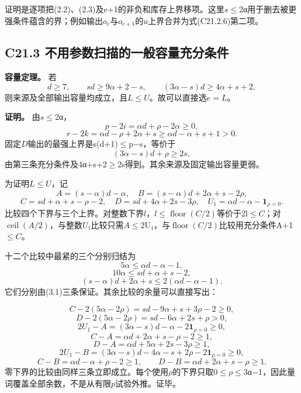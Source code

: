 {证明是逐项把(2.2)、(2.3)及e+1的非负和库存上界移项。这里\ensuremath{s}\ensuremath{\le}2α用于删去被更强条件蕴含的界；例如输出\ensuremath{o_{e}}与\ensuremath{o_{e+1}}的\ensuremath{u}上界合并为式(C21.2.6)第二项。}

\subsection*{\texorpdfstring{{C21.3} {不用参数扫描的一般容量充分条件}}{C21.3 不用参数扫描的一般容量充分条件}}\label{C21-h142}

\textbf{{容量定理。}} {若} \[
\boxed{
d\ge7,\qquad sd\ge9\alpha+2-s,\qquad
(3\alpha-s)d\ge4\alpha+s+2,
}
\tag{C21.3.1}
\] {则来源及全部输出容量均成立，且\ensuremath{L}\ensuremath{\le}\ensuremath{U}。故可以直接选\ensuremath{e=L}。}

\textbf{{证明。}} {由\ensuremath{s}\ensuremath{\le}2α，} \[
p-2i=\alpha d+\rho-2\alpha\ge0,
\] \[
r-2k=\alpha d-\rho+2\alpha+s
\ge\alpha d-\alpha+s+1>0.
\] {固定\ensuremath{D}输出的最强上界是s(d+1)\ensuremath{\le}p−s，等价于} \[
(3\alpha-s)d+\rho\ge2s,
\] {由第三条充分条件及4α+s+2\ensuremath{\ge}2s得到。其余来源及固定输出容量更弱。}

{为证明\ensuremath{L}\ensuremath{\le}\ensuremath{U}，记} \[
A=(s-\alpha)d-\alpha,\quad
B=(s-\alpha)d+2\alpha+s-2\rho,
\] \[
C=sd+\alpha+s-\rho-2,\quad
D=sd+4\alpha+2s-3\rho,\quad
U_1=\alpha d-\alpha-\mathbf1_{\rho=0}.
\] {比较四个下界与三个上界。对整数下界\ensuremath{l}，\ensuremath{l}\ensuremath{\le}\ensuremath{\operatorname{floor}(C/2)}等价于2l\ensuremath{\le}\ensuremath{C}；对\ensuremath{\operatorname{ceil}(A/2)}，与整数\ensuremath{U}₁比较只需\ensuremath{A}\ensuremath{\le}2U₁，与\ensuremath{\operatorname{floor}(C/2)}比较用充分条件A+1\ensuremath{\le}\ensuremath{C}。}

{十二个比较中最紧的三个分别归结为} \[
5\alpha\le\alpha d-\alpha-1,
\] \[
10\alpha\le sd+\alpha+s-2,
\] \[
(s-\alpha)d+2\alpha+s\le2(\alpha d-\alpha-1).
\] {它们分别由(3.1)三条保证。其余比较的余量可以直接写出：}

\[
C-2(5\alpha-2\rho)=sd-9\alpha+s+3\rho-2\ge0,
\] \[
D-2(5\alpha-2\rho)=sd-6\alpha+2s+\rho>0,
\] \[
2U_1-A=(3\alpha-s)d-\alpha-2\mathbf1_{\rho=0}\ge0,
\] \[
C-A=\alpha d+2\alpha+s-\rho-2\ge1,
\] \[
D-A=\alpha d+5\alpha+2s-3\rho\ge1,
\] \[
2U_1-B=(3\alpha-s)d-4\alpha-s+2\rho-2\mathbf1_{\rho=0}\ge0,
\] \[
C-B=\alpha d-\alpha+\rho-2\ge1,\qquad
D-B=\alpha d+2\alpha+s-\rho\ge1.
\] {零下界的比较由同样三条立即成立。每个使用\ensuremath{\rho }的下界只取0\ensuremath{\le}\ensuremath{\rho }\ensuremath{\le}3α−1，因此量词覆盖全部余数，不是从有限\ensuremath{p}试验外推。证毕。}

